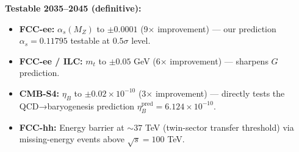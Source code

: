 \documentclass[
  11pt,
]{article}
\providecommand{\tightlist}{%
  \setlength{\itemsep}{0pt}\setlength{\parskip}{0pt}}
\begin{document}
\textbf{Testable 2035--2045 (definitive):}

\begin{itemize}
\tightlist
\item
  \textbf{FCC-ee:} \(\alpha_s(M_Z)\) to \(\pm 0.0001\) (9× improvement)
  --- our prediction \(\alpha_s = 0.11795\) testable at \(0.5\sigma\)
  level.
\item
  \textbf{FCC-ee / ILC:} \(m_t\) to \(\pm 0.05\) GeV (6× improvement)
  --- sharpens \(G\) prediction.
\item
  \textbf{CMB-S4:} \(\eta_B\) to \(\pm 0.02 \times 10^{-10}\) (3×
  improvement) --- directly tests the QCD→baryogenesis prediction
  \(\eta_B^{\text{pred}} = 6.124 \times 10^{-10}\).
\item
  \textbf{FCC-hh:} Energy barrier at \(\sim 37\) TeV (twin-sector
  transfer threshold) via missing-energy events above \(\sqrt{s} = 100\)
  TeV.
\end{itemize}
\end{document}
